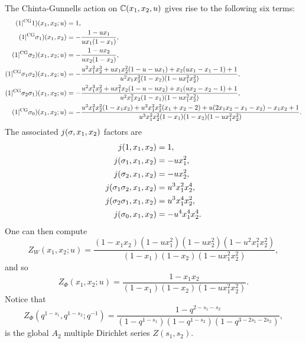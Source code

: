 \documentclass[12pt,reqno,oneside]{amsart}
\begin{document}
    The Chinta-Gunnells action on $\mathbb{C}(x_{1},x_{2},u)$ gives rise to the following six terms:
    \begin{align*}
        (1|^{\mathrm{CG}}1)(x_{1},x_{2};u) &= 1, \\
        (1|^{\mathrm{CG}}\sigma_{1})(x_{1},x_{2}) &= -\frac{1-ux_{1}}{ux_{1}(1-x_{1})}, \\
        (1|^{\mathrm{CG}}\sigma_{2})(x_{1},x_{2};u) &= -\frac{1-ux_{2}}{ux_{2}(1-x_{2})}, \\
        (1|^{\mathrm{CG}}\sigma_{1}\sigma_{2})(x_{1},x_{2};u) &= -\frac{u^{2}x_{1}^{2}x_{2}^{3}+ux_{1}x_{2}^{2}(1-u-ux_{1})+x_{2}(ux_{1}-x_{1}-1)+1}{u^{2}x_{1}x_{2}^{2}(1-x_{2})(1-ux_{1}^{2}x_{2}^{2})}, \\
        (1|^{\mathrm{CG}}\sigma_{2}\sigma_{1})(x_{1},x_{2};u) &= -\frac{u^{2}x_{1}^{3}x_{2}^{2}+ux_{1}^{2}x_{2}(1-u-ux_{2})+x_{1}(ux_{2}-x_{2}-1)+1}{u^{2}x_{1}^{2}x_{2}(1-x_{1})(1-ux_{1}^{2}x_{2}^{2})}, \\
        (1|^{\mathrm{CG}}\sigma_{0})(x_{1},x_{2};u) &= -\frac{u^{3}x_{1}^{2}x_{2}^{2}(1-x_{1}x_{2})+u^{2}x_{1}^{2}x_{2}^{2}(x_{1}+x_{2}-2)+u(2x_{1}x_{2}-x_{1}-x_{2})-x_{1}x_{2}+1}{u^{3}x_{1}^{2}x_{2}^{2}(1-x_{1})(1-x_{2})(1-ux_{1}^{2}x_{2}^{2})}.
    \end{align*}
    The associated $j(\sigma,x_{1},x_{2})$ factors are
    \begin{align*}
        j(1,x_{1},x_{2}) &= 1, \\
        j(\sigma_{1},x_{1},x_{2}) &= -ux_{1}^{2}, \\
        j(\sigma_{2},x_{1},x_{2}) &= -ux_{2}^{2}, \\
        j(\sigma_{1}\sigma_{2},x_{1},x_{2}) &= u^{3}x_{1}^{2}x_{2}^{4}, \\
        j(\sigma_{2}\sigma_{1},x_{1},x_{2}) &= u^{3}x_{1}^{4}x_{2}^{2}, \\
        j(\sigma_{0},x_{1},x_{2}) &= -u^{4}x_{1}^{4}x_{2}^{4}.
    \end{align*}
    One can then compute
    \[
        Z_{W}(x_{1},x_{2};u) = \frac{(1-x_{1}x_{2})(1-ux_{1}^{2})(1-ux_{2}^{2})(1-u^{2}x_{1}^{2}x_{2}^{2})}{(1-x_{1})(1-x_{2})(1-ux_{1}^{2}x_{2}^{2})},
    \]
    and so
    \[
        Z_{\Phi}(x_{1},x_{2};u) = \frac{1-x_{1}x_{2}}{(1-x_{1})(1-x_{2})(1-ux_{1}^{2}x_{2}^{2})}.
    \]
    Notice that
    \[
        Z_{\Phi}(q^{1-s_{1}},q^{1-s_{2}};q^{-1}) = \frac{1-q^{2-s_{1}-s_{2}}}{(1-q^{1-s_{1}})(1-q^{1-s_{2}})(1-q^{3-2s_{1}-2s_{2}})},
    \]
    is the global $A_{2}$ multiple Dirichlet series $Z(s_{1},s_{2})$.
\end{document}
